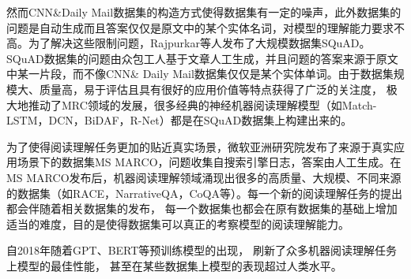 然而CNN\&Daily Mail数据集的构造方式使得数据集有一定的噪声，此外数据集的问题是自动生成而且答案仅仅是原文中的某个实体名词，对模型的理解能力要求不高。为了解决这些限制问题，Rajpurkar等人发布了大规模数据集SQuAD。SQuAD数据集的问题由众包工人基于文章人工生成，并且问题的答案来源于原文中某一片段，而不像CNN\& Daily Mail数据集仅仅是某个实体单词。由于数据集规模大、质量高，易于评估且具有很好的应用价值等特点获得了广泛的关注度，
极大地推动了MRC领域的发展，很多经典的神经机器阅读理解模型（如Match-LSTM，DCN，BiDAF，R-Net）都是在SQuAD数据集上构建出来的。

为了使得阅读理解任务更加的贴近真实场景，微软亚洲研究院发布了来源于真实应用场景下的数据集MS MARCO，问题收集自搜索引擎日志，答案由人工生成。在MS MARCO发布后，机器阅读理解领域涌现出很多的高质量、大规模、不同来源的数据集（如RACE，NarrativeQA，CoQA等）。每一个新的阅读理解任务的提出都会伴随着相关数据集的发布，
每一个数据集也都会在原有数据集的基础上增加适当的难度，目的是使得数据集可以真正的考察模型的阅读理解能力。

自2018年随着GPT、BERT等预训练模型的出现，
刷新了众多机器阅读理解任务上模型的最佳性能，
甚至在某些数据集上模型的表现超过人类水平。


%

%

